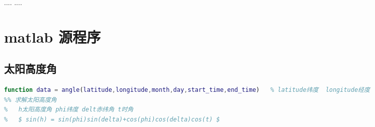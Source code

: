 \documentclass[withoutpreface,bwprint]{cumcmthesis} %
\begin{document}
\begin{table}[!htbp]



\begin{thebibliography}{9}%
  ....
  ....
\end{thebibliography}


\newpage
\appendix

\section{matlab 源程序}
\subsection{太阳高度角}

\begin{lstlisting}[language=matlab]
function data = angle(latitude,longitude,month,day,start_time,end_time)   % latitude纬度  longitude经度
%% 求解太阳高度角
%   h太阳高度角 phi纬度 delt赤纬角 t时角
%   $ sin(h) = sin(phi)sin(delta)+cos(phi)cos(delta)cos(t) $


\end{lstlisting}
\end{table}
\end{document}
